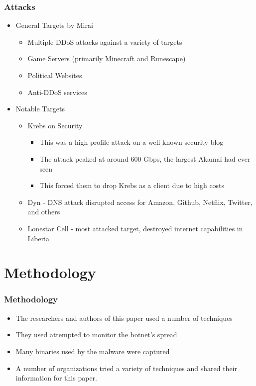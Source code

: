 \documentclass{beamer}
\begin{document}
\begin{frame}
    \frametitle{Attacks}
	\begin{itemize}
		\item<+-> General Targets by Mirai
			\begin{itemize}
				\item<+-> Multiple DDoS attacks against a variety of targets
				\item<+-> Game Servers (primarily Minecraft and Runescape)
				\item<+-> Political Websites
				\item<+-> Anti-DDoS services
			\end{itemize}
		\item<+-> Notable Targets
			\begin{itemize}
				\item<+-> Krebs on Security
				\begin{itemize}
					\item<+-> This was a high-profile attack on a well-known security blog
					\item<+-> The attack peaked at around 600 Gbps, the largest Akamai had ever seen 						\item<+-> This forced them to drop Krebs as a client due to high costs
				\end{itemize}
				\item<+-> Dyn - DNS attack disrupted access for Amazon, Github, Netflix, Twitter, and others
				\item<+-> Lonestar Cell - most attacked target, destroyed internet capabilities in Liberia
			\end{itemize}
	\end{itemize}
\end{frame}

\section{Methodology}

\begin{frame}
	\frametitle{Methodology}
	\begin{itemize}
		\item<+-> The researchers and authors of this paper used a number of techniques
		\item<+-> They used attempted to monitor the botnet's spread
		\item<+-> Many binaries used by the malware were captured
		\item<+-> A number of organizations tried a variety of techniques and shared their information for this paper.
	\end{itemize}
\end{frame}
\end{document}
